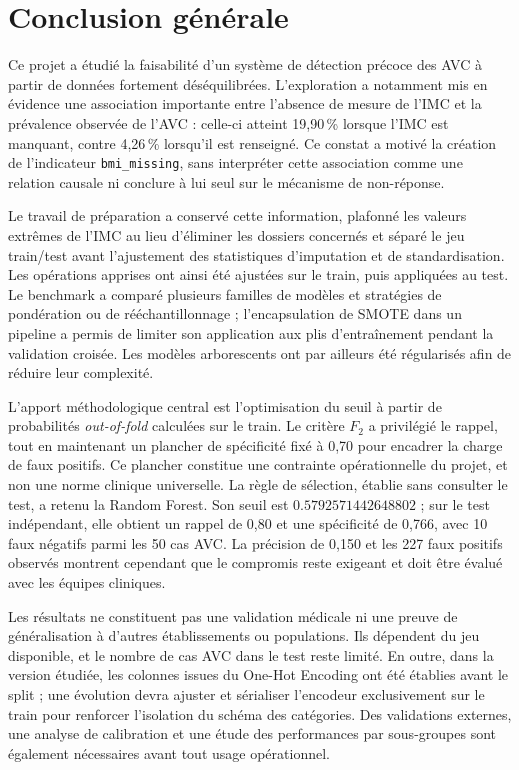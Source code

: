 \chapter*{Conclusion générale}

Ce projet a étudié la faisabilité d'un système de détection précoce des AVC à partir de données fortement déséquilibrées. L'exploration a notamment mis en évidence une association importante entre l'absence de mesure de l'IMC et la prévalence observée de l'AVC : celle-ci atteint 19,90\,\% lorsque l'IMC est manquant, contre 4,26\,\% lorsqu'il est renseigné. Ce constat a motivé la création de l'indicateur \texttt{bmi\_missing}, sans interpréter cette association comme une relation causale ni conclure à lui seul sur le mécanisme de non-réponse.

Le travail de préparation a conservé cette information, plafonné les valeurs extrêmes de l'IMC au lieu d'éliminer les dossiers concernés et séparé le jeu train/test avant l'ajustement des statistiques d'imputation et de standardisation. Les opérations apprises ont ainsi été ajustées sur le train, puis appliquées au test. Le benchmark a comparé plusieurs familles de modèles et stratégies de pondération ou de rééchantillonnage ; l'encapsulation de SMOTE dans un pipeline a permis de limiter son application aux plis d'entraînement pendant la validation croisée. Les modèles arborescents ont par ailleurs été régularisés afin de réduire leur complexité.

L'apport méthodologique central est l'optimisation du seuil à partir de probabilités \textit{out-of-fold} calculées sur le train. Le critère \(F_2\) a privilégié le rappel, tout en maintenant un plancher de spécificité fixé à 0,70 pour encadrer la charge de faux positifs. Ce plancher constitue une contrainte opérationnelle du projet, et non une norme clinique universelle. La règle de sélection, établie sans consulter le test, a retenu la Random Forest. Son seuil est \(0.5792571442648802\) ; sur le test indépendant, elle obtient un rappel de 0,80 et une spécificité de 0,766, avec 10 faux négatifs parmi les 50 cas AVC. La précision de 0,150 et les 227 faux positifs observés montrent cependant que le compromis reste exigeant et doit être évalué avec les équipes cliniques.

Les résultats ne constituent pas une validation médicale ni une preuve de généralisation à d'autres établissements ou populations. Ils dépendent du jeu disponible, et le nombre de cas AVC dans le test reste limité. En outre, dans la version étudiée, les colonnes issues du One-Hot Encoding ont été établies avant le split ; une évolution devra ajuster et sérialiser l'encodeur exclusivement sur le train pour renforcer l'isolation du schéma des catégories. Des validations externes, une analyse de calibration et une étude des performances par sous-groupes sont également nécessaires avant tout usage opérationnel.

